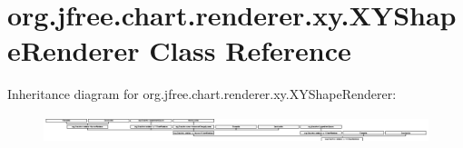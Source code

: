 \hypertarget{classorg_1_1jfree_1_1chart_1_1renderer_1_1xy_1_1_x_y_shape_renderer}{}\section{org.\+jfree.\+chart.\+renderer.\+xy.\+X\+Y\+Shape\+Renderer Class Reference}
\label{classorg_1_1jfree_1_1chart_1_1renderer_1_1xy_1_1_x_y_shape_renderer}
Inheritance diagram for org.\+jfree.\+chart.\+renderer.\+xy.\+X\+Y\+Shape\+Renderer\+:\begin{figure}[H]
\begin{center}
\leavevmode
\includegraphics[height=0.785138cm]{classorg_1_1jfree_1_1chart_1_1renderer_1_1xy_1_1_x_y_shape_renderer}
\end{center}
\end{figure}
